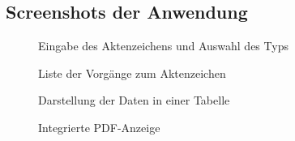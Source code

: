 \subsection{Screenshots der Anwendung}
\label{Screenshots}
\begin{figure}[h]
\centering
{}
\caption{Eingabe des Aktenzeichens und Auswahl des Typs}
\end{figure}
\begin{figure}[h]
\centering
{}
\caption{Liste der Vorgänge zum Aktenzeichen}
\end{figure}
\clearpage
\begin{figure}
    \centering
    \caption{Darstellung der Daten in einer Tabelle}
\end{figure}
\begin{figure}
    \centering
    \caption{Integrierte PDF-Anzeige}
\end{figure}
\clearpage

